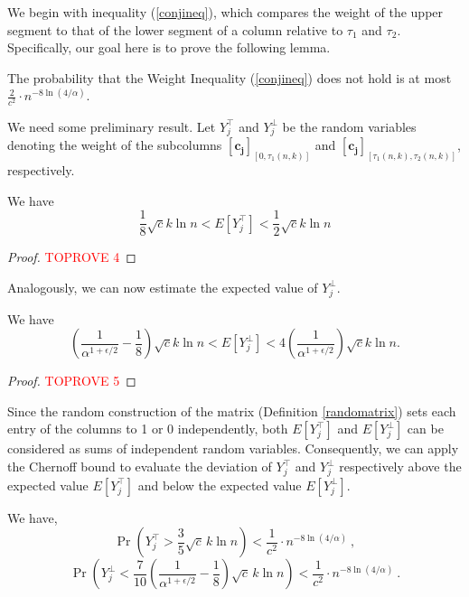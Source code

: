 \documentclass[11pt]{article}
\begin{document}
We begin with inequality (\ref{conjineq}), which compares the weight 
of the upper segment to that of the lower segment of a column relative to $\tau_1$ and $\tau_2$.
Specifically, our goal here is to prove the following lemma.
\begin{lemma}\label{lep1}
The probability that the Weight Inequality (\ref{conjineq}) 
does not hold is at most 
$\frac{2}{c^2} \cdot n^{-8\ln(4/\alpha)} $.
\end{lemma}

We need some preliminary result.
Let $Y^{\top}_j$ and $Y^{\perp}_j$ be the random variables denoting the weight of the  
subcolumns $\mathbf{[c_j]}_{[0, \tau_1(n,k)]}$ and 
$\mathbf{[c_j]}_{[\tau_1(n,k), \tau_2(n,k)]}$, respectively. 
\begin{lemma}\label{Eup}
We have
\[
 \frac{1}{8}  \sqrt{c} k \ln n          
         < E[Y^{\top}_j] < 
         \frac{1}{2}  \sqrt{c} k \ln n
 \]
\end{lemma}
\begin{proof}\textcolor{red}{TOPROVE 4}\end{proof}

Analogously, we can now estimate the expected value of $Y^{\perp}_j$.
\begin{lemma}\label{Edown}
We have
\[
  \left (\frac{1}{\alpha^{1+\epsilon/2}} - \frac{1}{8} \right )\sqrt{c} k \ln n  
      < E[Y^{\perp}_j] < 
   4 \left (\frac{1}{\alpha^{1 + \epsilon/2}}  \right )\sqrt{c} k \ln n .
\]
\end{lemma}
\begin{proof}\textcolor{red}{TOPROVE 5}\end{proof}

Since the random construction of the matrix (Definition \ref{randomatrix}) sets each entry of the columns to 1 or 0
independently, both $E[Y^{\top}_j]$ and $E[Y^{\perp}_j]$ can be considered as sums of independent random variables. 
Consequently, we can apply the Chernoff bound to evaluate the deviation of $Y^{\top}_j$ and $Y^{\perp}_j$
respectively above the expected value $E[Y^{\top}_j]$ and below the expected value $E[Y^{\perp}_j]$.

\begin{lemma}\label{lepa1}
We have,
\begin{equation*}
    	\Pr\left(Y^{\top}_j >  \frac{3}{5}\sqrt{c}\, k \ln n \right) 
     <  \frac{1}{c^2} \cdot n^{-8\ln(4/\alpha)}  \ , 
\end{equation*}
\begin{equation*}
    	\Pr\left(Y^{\perp}_j <  
     \frac{7}{10} \left (\frac{1}{\alpha^{1+\epsilon/2}} - \frac{1}{8} \right ) \sqrt{c}\, k \ln n \right)  
     <  \frac{1}{c^2} \cdot n^{-8\ln(4/\alpha)}  \ .
\end{equation*}
\end{lemma}
\end{document}
